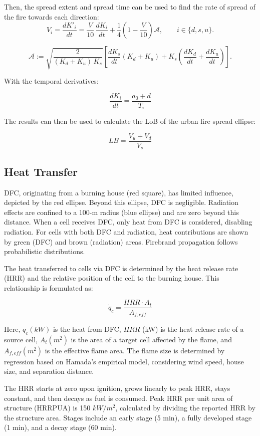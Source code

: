 Then, the spread extent and spread time can be used to find the rate of spread of the fire towards each direction:
\[
V_i
= \frac{dK'_i}{dt}
= \frac{V}{10}\,\frac{dK_i}{dt}
+ \frac{1}{4}\left(1 - \frac{V}{10}\right)\mathcal{A},
\qquad i \in \{d,s,u\}.
\]


\[
\mathcal{A} :=
\sqrt{\frac{2}{(K_d + K_u)\,K_s}}
\left[
  \frac{dK_s}{dt}(K_d + K_u)
  + K_s\!\left(\frac{dK_d}{dt} + \frac{dK_u}{dt}\right)
\right].
\]

With the temporal derivatives:

\[
\frac{dK_i}{dt}=\frac{a_0+d}{T_i}
\]

The results can then be used to calculate the LoB of the urban fire spread ellipse:

\[
LB = \frac{V_u+V_d}{V_s}
\]

\subsection{Heat Transfer}

DFC, originating from a burning house (red square), has limited influence, depicted by the red ellipse. Beyond this ellipse, DFC is negligible. Radiation effects are confined to a 100-m radius (blue ellipse) and are zero beyond this distance. When a cell receives DFC, only heat from DFC is considered, disabling radiation. For cells with both DFC and radiation, heat contributions are shown by green (DFC) and brown (radiation) areas. Firebrand propagation follows probabilistic distributions.

The heat transferred to cells via DFC is determined by the heat release rate (HRR) and the relative position of the cell to the burning house. This relationship is formulated as:

\[\dot{q}_c = \frac{HRR \cdot A_t}{A_{f,eff}}\]

Here, $\dot{q}_c (kW)$ is the heat from DFC, $HRR$ (kW) is the heat release rate of a source cell, $A_t (m^2)$ is the area of a target cell affected by the flame, and $A_{f,eff}(m^2)$ is the effective flame area. The flame size is determined by regression based on Hamada's empirical model, considering wind speed, house size, and separation distance.

The HRR starts at zero upon ignition, grows linearly to peak HRR, stays constant, and then decays as fuel is consumed. Peak HRR per unit area of structure (HRRPUA) is 150 $kW/m^2$, calculated by dividing the reported HRR by the structure area. Stages include an early stage (5 min), a fully developed stage (1 min), and a decay stage (60 min).


